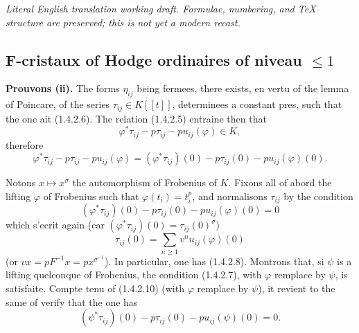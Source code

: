 \documentclass[12pt,a4paper]{article}
\theoremstyle{plain}
\theoremstyle{definition}
\theoremstyle{remark}
\begin{document}
\begin{center}\small\emph{Literal English translation working draft. Formulae, numbering, and TeX structure are preserved; this is not yet a modern recast.}\end{center}
\vspace{0.5em}


\setcounter{section}{1}
\setcounter{subsection}{3}
\setcounter{theorem}{1}

\subsection{F-cristaux of Hodge ordinaires of niveau $\leqslant 1$}

\textbf{Prouvons (ii).} The forms $\eta_{ij}$ being fermees, there exists, en vertu of the lemma of Poincare, of the series $\tau_{ij} \in K[[t]]$, determinees a constant pres, such that the one ait (1.4.2.6). The relation (1.4.2.5) entraine then that
\[
\varphi^*\tau_{ij} - p\tau_{ij} - pu_{ij}(\varphi) \in K,
\]
therefore
\begin{equation}\tag{1.4.2.10}
\varphi^*\tau_{ij} - p\tau_{ij} - pu_{ij}(\varphi) = (\varphi^*\tau_{ij})(0) - p\tau_{ij}(0) - pu_{ij}(\varphi)(0).
\end{equation}

Notons $x \mapsto x^\sigma$ the automorphism of Frobenius of $K$. Fixons all of abord the lifting $\varphi$ of Frobenius such that $\varphi(t_i) = t_i^p$, and normalisons $\tau_{ij}$ by the condition
\begin{equation}\tag{1.4.2.11}
(\varphi^*\tau_{ij})(0) - p\tau_{ij}(0) - pu_{ij}(\varphi)(0) = 0
\end{equation}
which s'ecrit again (car $(\varphi^*\tau_{ij})(0) = \tau_{ij}(0)^\sigma$)
\begin{equation}\tag{1.4.2.12}
\tau_{ij}(0) = \sum_{n\geqslant 1} v^n u_{ij}(\varphi)(0)
\end{equation}
(or $vx = pF^{-1}x = px^{\sigma^{-1}}$). In particular, one has (1.4.2.8). Montrons that, si $\psi$ is a lifting quelconque of Frobenius, the condition (1.4.2.7), with $\varphi$ remplace by $\psi$, is satisfaite. Compte tenu of (1.4.2.10) (with $\varphi$ remplace by $\psi$), it revient to the same of verify that the one has
\begin{equation}\tag{1.4.2.13}
(\psi^*\tau_{ij})(0) - p\tau_{ij}(0) - pu_{ij}(\psi)(0) = 0.
\end{equation}
\end{document}
